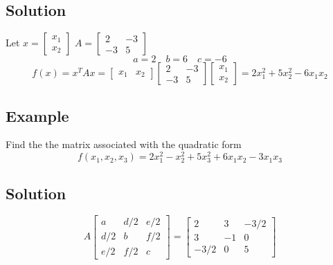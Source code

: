 \subsection*{Solution}
Let $x=\begin{bmatrix}
        x_1 \\ x_2
    \end{bmatrix}$ $A=\begin{bmatrix}
        2  & -3 \\
        -3 & 5
    \end{bmatrix}$
\[a=2 \quad b=6 \quad c=-6\]
\[
    f(x)=x^TAx=\begin{bmatrix}
        x_1 & x_2
    \end{bmatrix}\begin{bmatrix}
        2  & -3 \\
        -3 & 5
    \end{bmatrix}\begin{bmatrix}
        x_1 \\x_2
    \end{bmatrix}=2x_1^2+5x_2^2-6x_1x_2
\]

\subsection*{Example}
Find the the matrix associated with the quadratic form
\[f(x_1,x_2,x_3)=2x_1^2-x_2^2+5x_3^2+6x_1x_2-3x_1x_3\]

\subsection*{Solution}
\[A\begin{bmatrix}
        a   & d/2 & e/2 \\
        d/2 & b   & f/2 \\
        e/2 & f/2 & c
    \end{bmatrix}=\begin{bmatrix}
        2    & 3  & -3/2 \\
        3    & -1 & 0    \\
        -3/2 & 0  & 5
    \end{bmatrix}\]